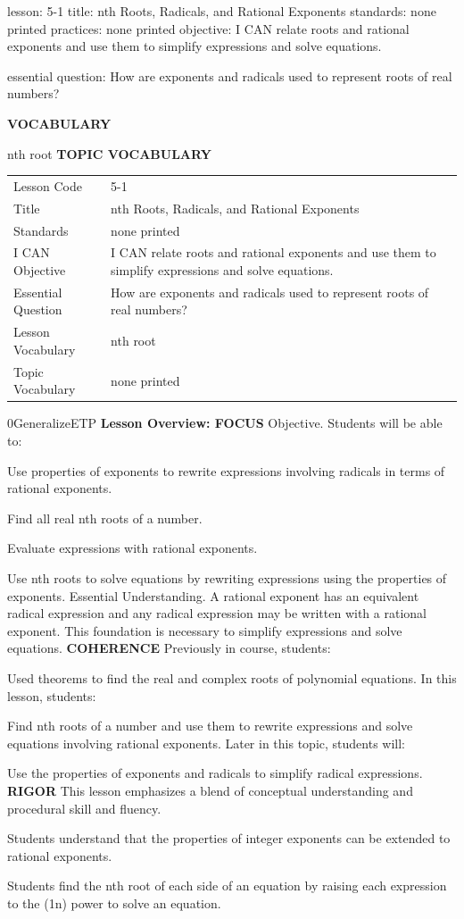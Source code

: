 \documentclass{article}
\newenvironment{lesson-meta}{}{}        %
\newenvironment{te-addendum}[2]{}{}     %
\newcommand{\te}[1]{}                   %
\begin{document}
\begin{lesson-meta}
lesson: 5-1
title: nth Roots, Radicals, and Rational Exponents
standards: none printed
practices: none printed
objective: I CAN relate roots and rational exponents and use them to simplify expressions and solve equations.

essential question: How are exponents and radicals used to represent roots of real numbers?

\textbf{VOCABULARY}
\item nth root
\textbf{TOPIC VOCABULARY}
\te{No topic vocabulary list is printed on these lesson pages.}
\begin{tabular}{ll}
Lesson Code & 5-1 \\
Title & nth Roots, Radicals, and Rational Exponents \\
Standards & none printed \\
I CAN Objective & I CAN relate roots and rational exponents and use them to simplify expressions and solve equations. \\
Essential Question & How are exponents and radicals used to represent roots of real numbers? \\
Lesson Vocabulary & nth root \\
Topic Vocabulary & none printed \\
\end{tabular}
\end{lesson-meta}
\begin{te-addendum}{0}{GeneralizeETP}
\textbf{Lesson Overview: FOCUS}
Objective. Students will be able to:
\item Use properties of exponents to rewrite expressions involving radicals in terms of rational exponents.
\item Find all real nth roots of a number.
\item Evaluate expressions with rational exponents.
\item Use nth roots to solve equations by rewriting expressions using the properties of exponents.
Essential Understanding. A rational exponent has an equivalent radical expression and any radical expression may be written with a rational exponent. This foundation is necessary to simplify expressions and solve equations.
\textbf{COHERENCE}
Previously in course, students:
\item Used theorems to find the real and complex roots of polynomial equations.
In this lesson, students:
\item Find nth roots of a number and use them to rewrite expressions and solve equations involving rational exponents.
Later in this topic, students will:
\item Use the properties of exponents and radicals to simplify radical expressions.
\textbf{RIGOR}
This lesson emphasizes a blend of conceptual understanding and procedural skill and fluency.
\item Students understand that the properties of integer exponents can be extended to rational exponents.
\item Students find the nth root of each side of an equation by raising each expression to the (\frac1n) power to solve an equation.
\end{te-addendum}
\end{document}
